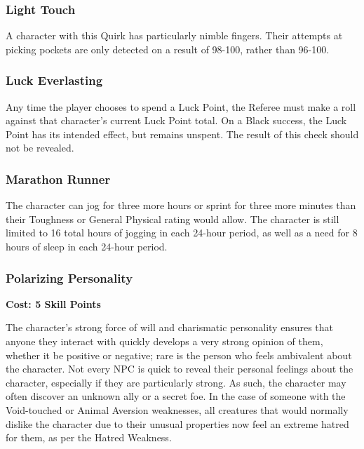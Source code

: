 \documentclass[oneside]{book}
\newcommand{\comment}[1]{}
\begin{document}
\begin{multicols}{2}
\subsubsection{Light Touch}
A character with this Quirk has particularly nimble fingers. Their attempts at picking pockets are only detected on a result of 98-100, rather than 96-100.     

\subsubsection{Luck Everlasting}
Any time the player chooses to spend a Luck Point, the Referee must make a roll against that character's current Luck Point total. On a Black success, the Luck Point has its intended effect, but remains unspent. The result of this check should not be revealed. 

\subsubsection{Marathon Runner}
The character can jog for three more hours or sprint for three more minutes than their Toughness or General Physical rating would allow. The character is still limited to 16 total hours of jogging in each 24-hour period, as well as a need for 8 hours of sleep in each 24-hour period.

\comment{
\subsubsection{Military Background}
Characters with this Quirk must have a rating of at least 1 in the Weapon Skill for the standard-issue weapon of their homeland's military. 

Past time spent in the military has taught the character a variety of useful things. Not least of which being how to belittle subordinates. The character gets a +3 bonus to using Fast Talk or Persuade while interacting with non-hostile, rank-and-file members of a militia or military. 
}

\subsubsection{Polarizing Personality}
\textbf{\small Cost: 5 Skill Points}

The character's strong force of will and charismatic personality ensures that anyone they interact with quickly develops a very strong opinion of them, whether it be positive or negative; rare is the person who feels ambivalent about the character. Not every NPC is quick to reveal their personal feelings about the character, especially if they are particularly strong. As such, the character may often discover an unknown ally or a secret foe. In the case of someone with the Void-touched or Animal Aversion weaknesses, all creatures that would normally dislike the character due to their unusual properties now feel an extreme hatred for them, as per the Hatred Weakness.


\end{multicols}
\end{document}
